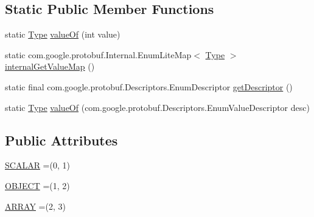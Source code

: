 \subsection*{Static Public Member Functions}
\begin{DoxyCompactItemize}
\item 
static \mbox{\hyperlink{enumcom_1_1mysql_1_1cj_1_1x_1_1protobuf_1_1_mysqlx_datatypes_1_1_any_1_1_type}{Type}} \mbox{\hyperlink{enumcom_1_1mysql_1_1cj_1_1x_1_1protobuf_1_1_mysqlx_datatypes_1_1_any_1_1_type_acc62fa8a15e399685d96bfb9759e9633}{value\+Of}} (int value)
\item 
static com.\+google.\+protobuf.\+Internal.\+Enum\+Lite\+Map$<$ \mbox{\hyperlink{enumcom_1_1mysql_1_1cj_1_1x_1_1protobuf_1_1_mysqlx_datatypes_1_1_any_1_1_type}{Type}} $>$ \mbox{\hyperlink{enumcom_1_1mysql_1_1cj_1_1x_1_1protobuf_1_1_mysqlx_datatypes_1_1_any_1_1_type_a026d66579a9eb140205a790cafc0a4f5}{internal\+Get\+Value\+Map}} ()
\item 
static final com.\+google.\+protobuf.\+Descriptors.\+Enum\+Descriptor \mbox{\hyperlink{enumcom_1_1mysql_1_1cj_1_1x_1_1protobuf_1_1_mysqlx_datatypes_1_1_any_1_1_type_ad5ae1f277b88664ebdb0be538768b8ae}{get\+Descriptor}} ()
\item 
static \mbox{\hyperlink{enumcom_1_1mysql_1_1cj_1_1x_1_1protobuf_1_1_mysqlx_datatypes_1_1_any_1_1_type}{Type}} \mbox{\hyperlink{enumcom_1_1mysql_1_1cj_1_1x_1_1protobuf_1_1_mysqlx_datatypes_1_1_any_1_1_type_a288a29f508a20f1571fe281dbf8ae5a6}{value\+Of}} (com.\+google.\+protobuf.\+Descriptors.\+Enum\+Value\+Descriptor desc)
\end{DoxyCompactItemize}
\subsection*{Public Attributes}
\begin{DoxyCompactItemize}
\item 
\mbox{\hyperlink{enumcom_1_1mysql_1_1cj_1_1x_1_1protobuf_1_1_mysqlx_datatypes_1_1_any_1_1_type_a14ad5260f4cc5fab9e5ea942d25f758d}{S\+C\+A\+L\+AR}} =(0, 1)
\item 
\mbox{\hyperlink{enumcom_1_1mysql_1_1cj_1_1x_1_1protobuf_1_1_mysqlx_datatypes_1_1_any_1_1_type_a8775d33409fc8c3f0d6ac1fdf9d59bb9}{O\+B\+J\+E\+CT}} =(1, 2)
\item 
\mbox{\hyperlink{enumcom_1_1mysql_1_1cj_1_1x_1_1protobuf_1_1_mysqlx_datatypes_1_1_any_1_1_type_ab2305401fad8b75a43c56a6f3c62c2b6}{A\+R\+R\+AY}} =(2, 3)
\end{DoxyCompactItemize}
